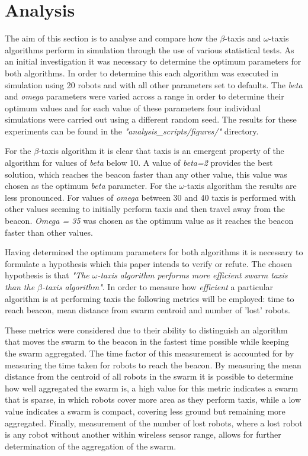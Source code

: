 \documentclass[conference]{IEEEtran}
\begin{document}
\section{Analysis}
The aim of this section is to analyse and compare how the $\beta$-taxis and $\omega$-taxis algorithms perform in simulation through the use of various statistical tests. As an initial investigation it was necessary to determine the optimum parameters for both algorithms. In order to determine this each algorithm was executed in simulation using 20 robots and with all other parameters set to defaults. The \textit{beta} and \textit{omega} parameters were varied across a range in order to determine their optimum values and for each value of these parameters four individual simulations were carried out using a different random seed. The results for these experiments can be found in the \textit{"analysis\_scripts/figures/"} directory. 

For the $\beta$-taxis algorithm it is clear that taxis is an emergent property of the algorithm for values of \textit{beta} below 10. A value of \textit{beta=2} provides the best solution, which reaches the beacon faster than any other value, this value was chosen as the optimum \textit{beta} parameter. For the $\omega$-taxis algorithm the results are less pronounced. For values of \textit{omega} between 30 and 40 taxis is performed with other values seeming to initially perform taxis and then travel away from the beacon. \textit{Omega = 35} was chosen as the optimum value as it reaches the beacon faster than other values. 

Having determined the optimum parameters for both algorithms it is necessary to formulate a hypothesis which this paper intends to verify or refute. The chosen hypothesis is that \textit{"The $\omega$-taxis algorithm performs more efficient swarm taxis than the $\beta$-taxis algorithm"}. In order to measure how \textit{efficient} a particular algorithm is at performing taxis the following metrics will be employed: time to reach beacon, mean distance from swarm centroid and number of 'lost' robots.

These metrics were considered due to their ability to distinguish an algorithm that moves the swarm to the beacon in the fastest time possible while keeping the swarm aggregated. The time factor of this measurement is accounted for by measuring the time taken for robots to reach the beacon. By measuring the mean distance from the centroid of all robots in the swarm it is possible to determine how well aggregated the swarm is, a high value for this metric indicates a swarm that is sparse, in which robots cover more area as they perform taxis, while a low value indicates a swarm is compact, covering less ground but remaining more aggregated. Finally, measurement of the number of lost robots, where a lost robot is any robot without another within wireless sensor range, allows for further determination of the aggregation of the swarm. 
\end{document}
